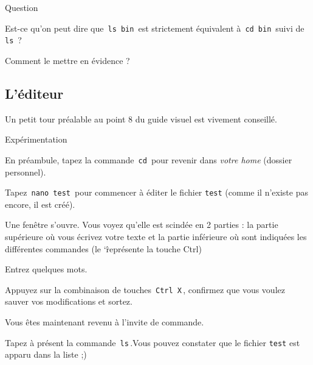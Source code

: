 \documentclass[a4paper,11pt]{article}
\begin{document}
\begin{Exercice}{Question} 

Est-ce qu'on peut dire que \,\verb|ls bin|\, est strictement \'equivalent \`a \,\verb|cd bin|\, suivi de \,\verb|ls|\, ?
				
\par
  Comment le mettre en \'evidence ?
 \par
										
			
 \end{Exercice}       
			


\subsection{L'éditeur}

Un petit tour pr\'ealable au point 8 du guide visuel est vivement conseill\'e.
				
\par
        
 \begin{Tutoriel}{Exp\'erimentation}     
\begin{steps}
\item En pr\'eambule, tapez la commande \,\verb|cd|\, pour revenir dans \textit{votre home} (dossier personnel).
\item Tapez \,\verb|nano test|\, pour commencer \`a \'editer le fichier \verb_test_ (comme il n'existe pas encore, il est cr\'e\'e).
\item Une fen\^etre s'ouvre. Vous voyez qu'elle est scind\'ee en 2 parties : la partie sup\'erieure o\`u vous \'ecrivez votre texte et la partie inf\'erieure o\`u sont indiqu\'ees les diff\'erentes commandes (le \char`\^ repr\'esente la touche Ctrl)
\item Entrez quelques mots.
\item Appuyez sur la combinaison de touches \,\verb|Ctrl X|\,, confirmez que vous voulez sauver vos modifications et sortez.
\item Vous \^etes maintenant revenu \`a l'invite de commande.
\item Tapez \`a pr\'esent la commande \,\verb|ls|\,.Vous pouvez constater que le fichier \verb_test_ est apparu dans la liste ;)
\end{steps}
\end{Tutoriel}
\end{document}
